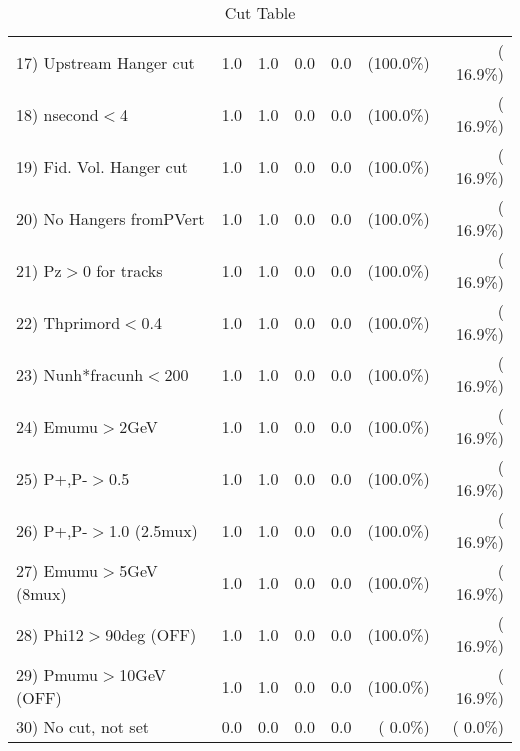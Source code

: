 \begin{table}[h!]
\begin{tabular}{||l||r|r|r|r|r|r||}
 17) Upstream Hanger cut  &          1.0 &          1.0 &          0.0 &          0.0 & (100.0\%) & ( 16.9\%) \\
 18) nsecond$<$4          &          1.0 &          1.0 &          0.0 &          0.0 & (100.0\%) & ( 16.9\%) \\
 19) Fid. Vol. Hanger cut &          1.0 &          1.0 &          0.0 &          0.0 & (100.0\%) & ( 16.9\%) \\
 20) No Hangers fromPVert &          1.0 &          1.0 &          0.0 &          0.0 & (100.0\%) & ( 16.9\%) \\
 21) Pz$>$0 for tracks    &          1.0 &          1.0 &          0.0 &          0.0 & (100.0\%) & ( 16.9\%) \\
 22) Thprimord$<$0.4      &          1.0 &          1.0 &          0.0 &          0.0 & (100.0\%) & ( 16.9\%) \\
 23) Nunh*fracunh$<$200   &          1.0 &          1.0 &          0.0 &          0.0 & (100.0\%) & ( 16.9\%) \\
 24) Emumu$>$2GeV         &          1.0 &          1.0 &          0.0 &          0.0 & (100.0\%) & ( 16.9\%) \\
 25) P+,P-$>$0.5          &          1.0 &          1.0 &          0.0 &          0.0 & (100.0\%) & ( 16.9\%) \\
 26) P+,P-$>$1.0 (2.5mux) &          1.0 &          1.0 &          0.0 &          0.0 & (100.0\%) & ( 16.9\%) \\
 27) Emumu$>$5GeV  (8mux) &          1.0 &          1.0 &          0.0 &          0.0 & (100.0\%) & ( 16.9\%) \\
 28) Phi12$>$90deg  (OFF) &          1.0 &          1.0 &          0.0 &          0.0 & (100.0\%) & ( 16.9\%) \\
 29) Pmumu$>$10GeV  (OFF) &          1.0 &          1.0 &          0.0 &          0.0 & (100.0\%) & ( 16.9\%) \\
 30) No cut, not set      &          0.0 &          0.0 &          0.0 &          0.0 & (  0.0\%) & (  0.0\%) \\
 \hline
 \hline
 \end{tabular}
 \caption{Cut Table           }
 \label{tab-cutheavy_neutrino_4.000}
 \end{table}
